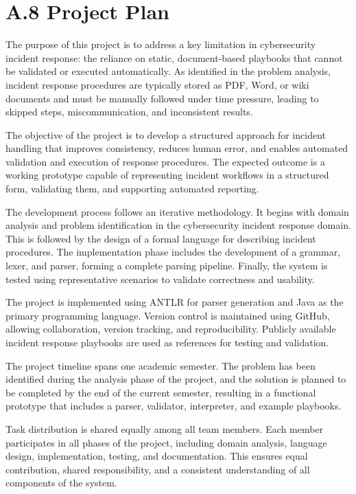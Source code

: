 \section*{A.8 Project Plan}

The purpose of this project is to address a key limitation in cybersecurity incident response: the reliance on static, document-based playbooks that cannot be validated or executed automatically. As identified in the problem analysis, incident response procedures are typically stored as PDF, Word, or wiki documents and must be manually followed under time pressure, leading to skipped steps, miscommunication, and inconsistent results.

The objective of the project is to develop a structured approach for incident handling that improves consistency, reduces human error, and enables automated validation and execution of response procedures. The expected outcome is a working prototype capable of representing incident workflows in a structured form, validating them, and supporting automated reporting.

The development process follows an iterative methodology. It begins with domain analysis and problem identification in the cybersecurity incident response domain. This is followed by the design of a formal language for describing incident procedures. The implementation phase includes the development of a grammar, lexer, and parser, forming a complete parsing pipeline. Finally, the system is tested using representative scenarios to validate correctness and usability.

The project is implemented using ANTLR for parser generation and Java as the primary programming language. Version control is maintained using GitHub, allowing collaboration, version tracking, and reproducibility. Publicly available incident response playbooks are used as references for testing and validation.

The project timeline spans one academic semester. The problem has been identified during the analysis phase of the project, and the solution is planned to be completed by the end of the current semester, resulting in a functional prototype that includes a parser, validator, interpreter, and example playbooks.

Task distribution is shared equally among all team members. Each member participates in all phases of the project, including domain analysis, language design, implementation, testing, and documentation. This ensures equal contribution, shared responsibility, and a consistent understanding of all components of the system.

